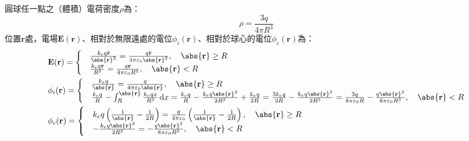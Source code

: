 \documentclass[a4paper,12pt]{report}
\begin{document}
\begin{itemize}
圓球任一點之（體積）電荷密度$\rho$為：
\[\rho=\frac{3q}{4\pi R^3}\]
位置$\mathbf{r}$處，電場$\mathbf{E}(\mathbf{r})$、相對於無限遠處的電位$\phi_i(\mathbf{r})$、相對於球心的電位$\phi_c(\mathbf{r})$為：
\[\begin{aligned}
& \mathbf{E}(\mathbf{r})=
\begin{cases}
& \frac{k_eq\hat{\mathbf{r}}}{\abs{\mathbf{r}}^2}=\frac{q\hat{\mathbf{r}}}{4\pi\varepsilon_0\abs{\mathbf{r}}^2},\quad\abs{\mathbf{r}}\geq R\\
& \frac{k_eq\mathbf{r}}{R^3}=\frac{q\mathbf{r}}{4\pi\varepsilon_0 R^3},\quad\abs{\mathbf{r}}<R
\end{cases}\\
& \phi_i(\mathbf{r}) = 
\begin{cases}
& \frac{k_eq}{\abs{\mathbf{r}}}=\frac{q}{4\pi\varepsilon_0\abs{\mathbf{r}}},\quad\abs{\mathbf{r}}\geq R\\
& \frac{k_eq}{R}-\int_R^{\abs{\mathbf{r}}}\frac{k_eqx}{R^3}\,\mathrm{d}x=\frac{k_eq}{R}-\frac{k_eq\abs{\mathbf{r}}^2}{2R^3}+\frac{k_eq}{2R}=\frac{3k_eq}{2R}-\frac{k_eq\abs{\mathbf{r}}^2}{2R^3}=\frac{3q}{8\pi\varepsilon_0 R}-\frac{q\abs{\mathbf{r}}^2}{8\pi\varepsilon_0 R^3},\quad\abs{\mathbf{r}}<R
\end{cases}\\
& \phi_c(\mathbf{r}) = 
\begin{cases}
& k_eq\left(\frac{1}{\abs{\mathbf{r}}}-\frac{1}{2R}\right)=\frac{q}{4\pi\varepsilon_0}\left(\frac{1}{\abs{\mathbf{r}}}-\frac{1}{2R}\right),\quad\abs{\mathbf{r}}\geq R\\
& -\frac{k_eq\abs{\mathbf{r}}^2}{2R^3}=-\frac{q\abs{\mathbf{r}}^2}{8\pi\varepsilon_0 R^3},\quad\abs{\mathbf{r}}<R
\end{cases}
\end{aligned}\]

\end{itemize}
\end{document}
